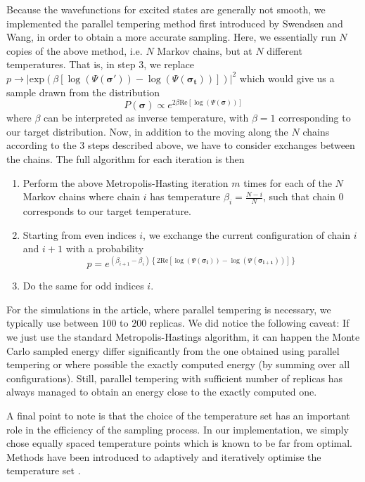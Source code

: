 \documentclass[aps,prl,twocolumn,amsmath,amssymb,superscriptaddress,floatfix]{revtex4-1}
\begin{document}
\begin{widetext}
Because the wavefunctions for excited states are generally not smooth, we implemented the parallel tempering method \cite{ParallelTempering1986} first introduced by Swendsen and Wang, in order to obtain a more accurate sampling. Here, we essentially run $N$ copies of the above method,  i.e. $N$ Markov chains, but at $N$ different temperatures. That is, in step 3, we replace $ p \rightarrow \left| \textrm{exp}(\beta[\log(\Psi(\boldsymbol{\sigma'})) - \log(\Psi(\boldsymbol{\sigma_{t}}))])\right|^{2}$ which would give us a sample drawn from the distribution 
\begin{equation}
P(\boldsymbol{\sigma})  \propto e^{2\beta\textrm{Re}[\log(\Psi(\boldsymbol{\sigma}))]}
\end{equation}
where $\beta$ can be interpreted as inverse temperature, with $\beta=1$ corresponding to our target distribution. Now, in addition to the moving along the $N$ chains according to the 3 steps described above, we have to consider exchanges between the chains. The full algorithm for each iteration is then
\begin{enumerate}
\item Perform the above Metropolis-Hasting iteration $m$ times for each of the $N$ Markov chains where chain $i$ has temperature $\beta_{i} = \frac{N-i}{N}$, such that chain $0$ corresponds to our target temperature.
\item Starting from even indices $i$, we exchange the current configuration of chain $i$ and $i+1$ with a probability
\begin{equation}
p = e^{(\beta_{i+1} - \beta_{i})\left\{2\textrm{Re}[\log(\Psi(\boldsymbol{\sigma_{i}})) - \log(\Psi(\boldsymbol{\sigma_{i+1}}))]\right\}}
\end{equation}
\item Do the same for odd indices $i$.
\end{enumerate} 
For the simulations in the article, where parallel tempering is necessary, we typically use between $100$ to $200$ replicas. We did notice the following caveat: If we just use the standard Metropolis-Hastings algorithm, it can happen the Monte Carlo sampled energy differ significantly from the one obtained using parallel tempering or where possible the exactly computed energy (by summing over all configurations). Still, parallel tempering with sufficient number of replicas has always managed to obtain an energy close to the exactly computed one. 

A final point to note is that the choice of the temperature set has an important role in the efficiency of the sampling process. In our implementation, we simply chose equally spaced temperature points which is known to be far from optimal. Methods have been introduced to adaptively and iteratively optimise the temperature set \cite{OptimisedPT2006}. 


\end{widetext}
\end{document}
